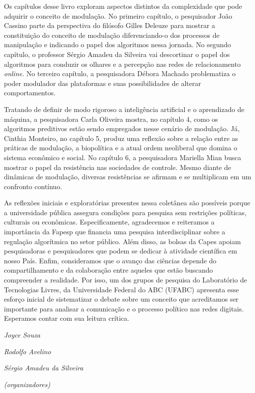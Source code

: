 Os capítulos desse livro exploram aspectos distintos da complexidade que
pode adquirir o conceito de modulação. No primeiro capítulo, o
pesquisador João Cassino parte da perspectiva do filósofo Gilles Deleuze
para mostrar a constituição do conceito de modulação diferenciando-o dos
processos de manipulação e indicando o papel dos algoritmos nessa
jornada. No segundo capítulo, o professor Sérgio Amadeu da Silveira vai
descortinar o papel dos algoritmos para conduzir os olhares e a
percepção nas redes de relacionamento \emph{online}. No terceiro
capítulo, a pesquisadora Débora Machado problematiza o poder modulador
das plataformas e suas possibilidades de alterar comportamentos.

Tratando de definir de modo rigoroso a inteligência artificial e o
aprendizado de máquina, a pesquisadora Carla Oliveira mostra, no
capítulo 4, como os algoritmos preditivos estão sendo empregados nesse
cenário de modulação. Já, Cinthia Monteiro, no capítulo 5, produz uma
reflexão sobre a relação entre as práticas de modulação, a biopolítica e
a atual ordem neoliberal que domina o sistema econômico e social. No
capítulo 6, a pesquisadora Mariella Mian busca mostrar o papel da
resistência nas sociedades de controle. Mesmo diante de dinâmicas de
modulação, diversas resistências se afirmam e se multiplicam em um
confronto contínuo.

As reflexões iniciais e exploratórias presentes nessa coletânea são
possíveis porque a universidade pública assegura condições para pesquisa
sem restrições políticas, culturais ou econômicas. Especificamente,
agradecemos e reiteramos a importância da Fapesp que financia uma
pesquisa interdisciplinar sobre a regulação algorítmica no setor
público. Além disso, as bolsas da Capes apoiam pesquisadoras e
pesquisadores que podem se dedicar à atividade científica em nosso País.
Enfim, consideramos que o avanço das ciências depende do
compartilhamento e da colaboração entre aqueles que estão buscando
compreender a realidade. Por isso, um dos grupos de pesquisa do
Laboratório de Tecnologias Livres, da Universidade Federal do ABC
(UFABC) apresenta esse esforço inicial de sistematizar o debate sobre um
conceito que acreditamos ser importante para analisar a comunicação e o
processo político nas redes digitais. Esperamos contar com sua leitura
crítica.

\begin{flushright}
\emph{Joyce Souza}

\emph{Rodolfo Avelino}

\emph{Sérgio Amadeu da Silveira}

\emph{(organizadores)}
\end{flushright}